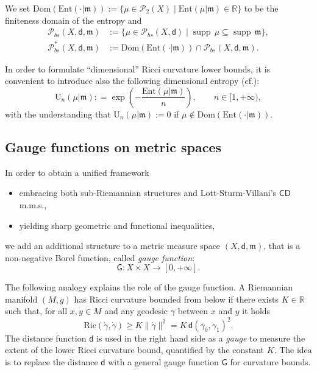 \documentclass[11pt,a4paper]{article}
\theoremstyle{plain}
\theoremstyle{definition}
\theoremstyle{remark}
\numberwithin{equation}{section}
\newcommand{\R}{\mathbb{R}} %
\DeclareMathOperator{\supp}{\mathrm{supp}}
\newcommand{\CD}{\mathsf{CD}}
\newcommand{\Ent}{\mathrm{Ent}}
\newcommand{\U}{\mathrm{U}}
\newcommand{\Dom}{\mathrm{Dom}}
\newcommand{\Prob}{\mathcal{P}}
\newcommand{\Ric}{\mathrm{Ric}}
\newcommand{\mm}{\mathfrak m}
\newcommand{\sfd}{\mathsf d}
\newcommand{\sfG}{\mathsf G}
\begin{document}
We set  $\Dom(\Ent(\cdot|\mm)):=\{\mu\in \mathcal{P}_{2}(X)\mid \Ent(\mu|\mm)\in \R\}$ to be the finiteness domain of the entropy and 
\begin{align*}
\Prob_{bs}(X,\sfd,\mm)&:=  \{\mu\in \Prob_{bs}(X,\sfd)\mid \supp \, \mu\subseteq \supp \, \mm\},\\
\Prob_{bs}^*(X,\sfd,\mm)&:= \Dom(\Ent(\cdot|\mm)) \cap \Prob_{bs}(X,\sfd,\mm).
\end{align*}

In order to formulate ``dimensional''  Ricci curvature lower bounds, it is convenient  to introduce also  the following dimensional entropy (cf.\@ \cite{EKS}):
\begin{equation}\label{eq:defUn}
\U_{n}(\mu|\mm) : = \exp\left(-\frac{\Ent(\mu|\mm)}{n}\right), \qquad n\in [1,+\infty),
\end{equation}
with the understanding that $\U_{n}(\mu|\mm):=0$ if $\mu\notin \Dom(\Ent(\cdot|\mm))$.


\subsection{Gauge functions on metric spaces}

In order to obtain a unified framework
\begin{itemize}
\item embracing both sub-Riemannian structures and Lott-Sturm-Villani's $\CD$ m.m.s., 
\item yielding sharp geometric and functional inequalities, 
\end{itemize}
we add an additional structure to a metric measure space $(X,\sfd,\mm)$, that is a non-negative Borel function, called \emph{gauge function}:
\begin{equation}\label{eq:defG}
\sfG: X\times X\to [0,+\infty].
\end{equation}


The following analogy explains the role of the gauge function. A Riemannian manifold $(M,g)$ has Ricci curvature bounded from below if there exists $K \in \R$ such that, for all $x,y\in M$ and any geodesic $\gamma$ between $x$ and $y$ it holds
\begin{equation}
\Ric(\dot\gamma,\dot\gamma) \geq K \|\dot\gamma\|^2 = K \,  \sfd(\gamma_0,\gamma_1)^2.
\end{equation}
The distance function $\sfd$ is used in the right hand side as a \emph{gauge} to measure the extent of the lower Ricci curvature bound, quantified by the constant $K$. The idea is to replace the distance $\sfd$ with a general gauge function $\sfG$ for curvature bounds.
\end{document}
